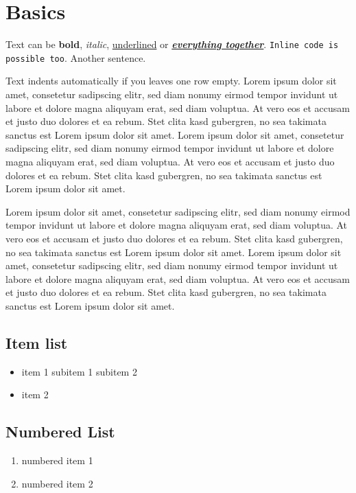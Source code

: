 
\chapter{Basics}
Text can be \textbf{bold}, \textit{italic}, \underline{underlined} or \textbf{\textit{\underline{everything together}}}. \texttt{Inline code is possible too}. Another sentence.

Text indents automatically if you leaves one row empty. Lorem ipsum dolor sit amet, consetetur sadipscing elitr, sed diam nonumy eirmod tempor invidunt ut labore et dolore magna aliquyam erat, sed diam voluptua. At vero eos et accusam et justo duo dolores et ea rebum. Stet clita kasd gubergren, no sea takimata sanctus est Lorem ipsum dolor sit amet. Lorem ipsum dolor sit amet, consetetur sadipscing elitr, sed diam nonumy eirmod tempor invidunt ut labore et dolore magna aliquyam erat, sed diam voluptua. At vero eos et accusam et justo duo dolores et ea rebum. Stet clita kasd gubergren, no sea takimata sanctus est Lorem ipsum dolor sit amet. \cite{Albrecht2010}

Lorem ipsum dolor sit amet, consetetur sadipscing elitr, sed diam nonumy eirmod tempor invidunt ut labore et dolore magna aliquyam erat, sed diam voluptua. At vero eos et accusam et justo duo dolores et ea rebum. Stet clita kasd gubergren, no sea takimata sanctus est Lorem ipsum dolor sit amet. Lorem ipsum dolor sit amet, consetetur sadipscing elitr, sed diam nonumy eirmod tempor invidunt ut labore et dolore magna aliquyam erat, sed diam voluptua. At vero eos et accusam et justo duo dolores et ea rebum. Stet clita kasd gubergren, no sea takimata sanctus est Lorem ipsum dolor sit amet. \cite{hdl_routing} \cite{light_leakage_color}

\section{Item list}
\begin{itemize}
	\item item 1
	\subitem subitem 1
	\subitem subitem 2
	\item item 2
\end{itemize}

\section{Numbered List}
\begin{enumerate}
	\item numbered item 1
	\item numbered item 2
\end{enumerate}

